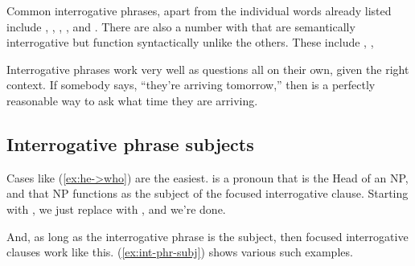 \ea
    \label{ex:who-s-the-kid}
    \label{ex:precisely-who}
    \label{ex:what-time}
    \label{ex:at-what-time}
    \z\label{ex:int-phrases}
\z
Common interrogative phrases, apart from the individual words already listed include , , , , and . There are also a number with  that are semantically interrogative but function syntactically unlike the others. These include , , 

Interrogative phrases work very well as questions all on their own, given the right context. If somebody says, \enquote{they're arriving tomorrow,} then  is a perfectly reasonable way to ask what time they are arriving.

\subsection{Interrogative phrase subjects}\label{sec:focussed-subj}

Cases like (\ref{ex:he->who}) are the easiest.  is a pronoun that is the \textsf{Head} of an NP, and that NP functions as the subject of the focused interrogative clause. Starting with , we just replace  with , and we're done.

    \label{ex:he->who}
    \z
And, as long as the interrogative phrase is the subject, then focused interrogative clauses work like this. (\ref{ex:int-phr-subj}) shows various such examples.

